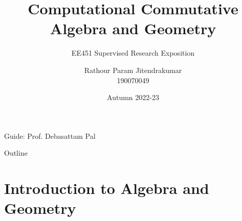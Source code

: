 \documentclass[aspectratio=169, handout, 10pt, hyperref=colorlinks]{beamer}
\title{Computational Commutative Algebra and Geometry}
\subtitle{EE451 Supervised Research Exposition}
\author[Param Rathour]{Rathour Param Jitendrakumar\\190070049}
\institute[IIT Bombay]{Department of Electrical Engineering\\
Indian Institue of Technology Bombay} %
\date{Autumn 2022-23}
\begin{document}
\begin{frame}
  \titlepage
  \begin{center}
    Guide: Prof. Debasattam Pal
  \end{center}
\end{frame}

\begin{frame}{Outline}
  \tableofcontents
\end{frame}

\section{Introduction to Algebra and Geometry}
\end{document}
